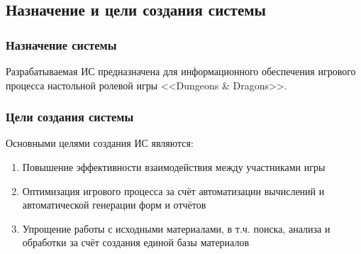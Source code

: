 \subsection{Назначение и цели создания системы}

\subsubsection{Назначение системы}
Разрабатываемая ИС предназначена для информационного обеспечения игрового процесса настольной ролевой игры <<Dungeons \& Dragons>>.

\subsubsection{Цели создания системы}
Основными целями создания ИС являются:
\begin{enumerate}
\item Повышение эффективности взаимодействия между участниками игры
\item Оптимизация игрового процесса за счёт автоматизации вычислений и автоматической генерации форм и отчётов
\item Упрощение работы с исходными материалами, в т.ч. поиска, анализа и обработки за счёт создания единой базы материалов
\end{enumerate}
